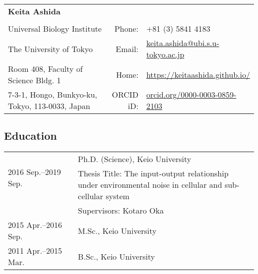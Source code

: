 \documentclass[12pt,]{scrartcl}
\date{}
\begin{document}
\begin{table}[h]
{\def\arraystretch{1.2}\tabcolsep=0pt
\begin{tabular}{p{0.60\linewidth}p{0.05\linewidth}p{0.35\linewidth}}

  \multirow{1}{*}{\LARGE \textbf{Keita Ashida}} &  &  \\
  
  & & \\
  
    Universal Biology Institute & \multicolumn{1}{r}{Phone:\;\;} & \multicolumn{1}{l}{$+$81 (3) 5841 4183}\\
  
  The University of Tokyo & \multicolumn{1}{r}{Email:\;\;} &\multicolumn{1}{l}{\href{keita.ashida@ubi.s.u-tokyo.ac.jp}{keita.ashida@ubi.s.u-tokyo.ac.jp}} \\
  
  Room 408, Faculty of Science Bldg. 1 & \multicolumn{1}{r}{Home:\;\;} & \multicolumn{1}{l}{\url{https://keitaashida.github.io/}} \\
  
  7-3-1, Hongo, Bunkyo-ku, Tokyo, 113-0033, Japan & \multicolumn{1}{r}{ORCID iD:\;\;} & \multicolumn{1}{l}{\href{https://orcid.org/0000-0003-0859-2103}{orcid.org/0000-0003-0859-2103}}\\
\end{tabular}
}
\end{table}

\subsection{Education}\label{education}

\begin{table}[h]
{\def\arraystretch{1.5}\tabcolsep=0pt
\begin{tabular}{p{0.28\linewidth}p{0.75\linewidth}}
    \multirow{2}{*}[0.85em]{2016 Sep.--2019 Sep.} & Ph.D. (Science), Keio University\\
  & Thesis Title: The input-output relationship under environmental noise in cellular and sub-cellular system\\
  & Supervisors: Kotaro Oka\\
  
  2015 Apr.--2016 Sep. & M.Sc., Keio University\\

  2011 Apr.--2015 Mar. & B.Sc., Keio University\\

\end{tabular}
}
\end{table}
\end{document}
